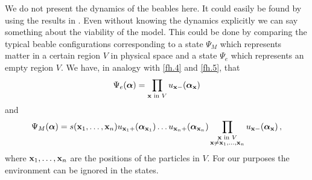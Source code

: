 \documentclass[12pt]{article}
\begin{document}
We do not present the dynamics of the beables here. It could easily be found by using the results in \cite{struyve09a}. Even without knowing the dynamics explicitly we can say something about the viability of the model. This could be done by comparing the typical beable configurations corresponding to a state $\Psi_M$ which represents matter in a certain region $V$ in physical space and a state $\Psi_e$ which represents an empty region $V$. We have, in analogy with \eqref{fh.4} and \eqref{fh.5}, that 
\begin{equation}
\Psi_e({\boldsymbol \alpha}) = \prod_{{\bf x} {\textrm{ in }}V}  u_{{\bf x} -} ({\boldsymbol \alpha}_{\bf x}) 
\label{fh.7}
\end{equation}
and 
\begin{equation}
\Psi_M({\boldsymbol \alpha}) = s({\bf x}_1,\dots,{\bf x}_n) u_{{\bf x}_1 +}  ({\boldsymbol \alpha}_{{\bf x}_1}) \dots u_{{\bf x}_n +}({\boldsymbol \alpha}_{{\bf x}_n}) \prod_{\substack{{\bf x} {\textrm{ in }}V \\ {\bf x} \neq {\bf x}_1, \dots, {\bf x}_n  } } u_{{\bf x} -} ({\boldsymbol \alpha}_{\bf x})\,,
\label{fh.6}
\end{equation}
where ${\bf x}_1,\dots,{\bf x}_n$ are the positions of the particles in $V$. For our purposes the environment can be ignored in the states. 
\end{document}
